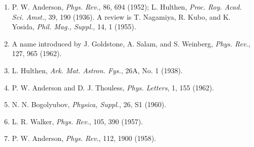 \begin{enumerate}[label=(\arabic*),leftmargin=2.8em,itemsep=1pt,parsep=0pt]
\item P. W. Anderson, \emph{Phys. Rev.}, 86, 694 (1952); L. Hulthen, \emph{Proc. Roy. Acad. Sci. Amst.}, 39, 190 (1936). A review is T. Nagamiya, R. Kubo, and K. Yosida, \emph{Phil. Mag., Suppl.}, 14, 1 (1955).
\item A name introduced by J. Goldstone, A. Salam, and S. Weinberg, \emph{Phys. Rev.}, 127, 965 (1962).
\item L. Hulthen, \emph{Ark. Mat. Astron. Fys.}, 26A, No. 1 (1938).
\item P. W. Anderson and D. J. Thouless, \emph{Phys. Letters}, 1, 155 (1962).
\item N. N. Bogolyubov, \emph{Physica, Suppl.}, 26, S1 (1960).
\item L. R. Walker, \emph{Phys. Rev.}, 105, 390 (1957).
\item P. W. Anderson, \emph{Phys. Rev.}, 112, 1900 (1958).
\end{enumerate}
